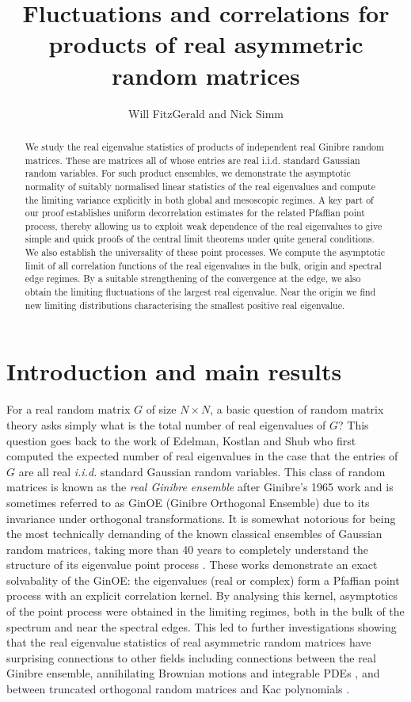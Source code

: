 \documentclass[11pt,reqno]{amsproc}
\title{Fluctuations and correlations for products of real asymmetric random matrices}
\author{Will FitzGerald and Nick Simm}
\numberwithin{equation}{section}
\numberwithin{theorem}{section}
\begin{document}
\maketitle
\begin{abstract}
We study the real eigenvalue statistics of products of independent real Ginibre random matrices. These are matrices all of whose entries are real i.i.d. standard Gaussian random variables. For such product ensembles, we demonstrate the asymptotic normality of suitably normalised linear statistics of the real eigenvalues and compute the limiting variance explicitly in both global and mesoscopic regimes. A key part of our proof establishes uniform decorrelation estimates for the related Pfaffian point process, thereby allowing us to exploit weak dependence of the real eigenvalues to give simple and quick proofs of the central limit theorems under quite general conditions. We also establish the universality of these point processes. We compute the asymptotic limit of all correlation functions of the real eigenvalues in the bulk, origin and spectral edge regimes. By a suitable strengthening of the convergence at the edge, we also obtain the limiting fluctuations of the largest real eigenvalue. Near the origin we find new limiting distributions characterising the smallest positive real eigenvalue.
\end{abstract}

\section{Introduction and main results}
For a real random matrix $G$ of size $N \times N$, a basic question of random matrix theory asks simply what is the total number of real eigenvalues of $G$? This question goes back to the work of Edelman, Kostlan and Shub \cite{EKS94} who first computed the expected number of real eigenvalues in the case that the entries of $G$ are all real \textit{i.i.d.} standard Gaussian random variables. This class of random matrices is known as the \textit{real Ginibre ensemble} after Ginibre's 1965 work \cite{Gin65} and is sometimes referred to as GinOE (Ginibre Orthogonal Ensemble) due to its invariance under orthogonal transformations. It is somewhat notorious for being the most technically demanding of the known classical ensembles of Gaussian random matrices, taking more than 40 years to completely understand the structure of its eigenvalue point process \cite{LS91,Sin07, FN07, SW08, BS09}. These works demonstrate an exact solvabality of the GinOE: the eigenvalues (real or complex) form a Pfaffian point process with an explicit correlation kernel. By analysing this kernel, asymptotics of the point process were obtained in the limiting regimes, both in the bulk of the spectrum and near the spectral edges. This led to further investigations showing that the real eigenvalue statistics of real asymmetric random matrices have surprising connections to other fields including connections between the real Ginibre ensemble, annihilating Brownian motions \cite{TZ11} and integrable PDEs \cite{BB20}, and between truncated orthogonal random matrices and Kac polynomials \cite{F10}.
\end{document}
